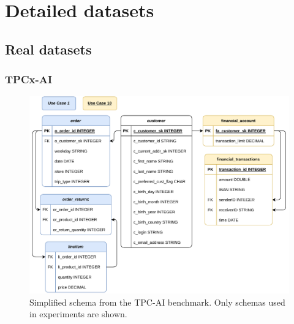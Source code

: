\chapter{Detailed datasets}


\section{Real datasets}
\subsection{TPCx-AI}

\begin{figure}[ht]
    \centering
    \includegraphics[width=0.99\linewidth]{appendices/figures/tpc-ai-schema.pdf}
    \caption{Simplified schema from the TPC-AI \cite{tpcx_ai} benchmark. Only schemas used in experiments are shown.}
    \label{fig:appendix-tpc-ai-schema}
\end{figure}